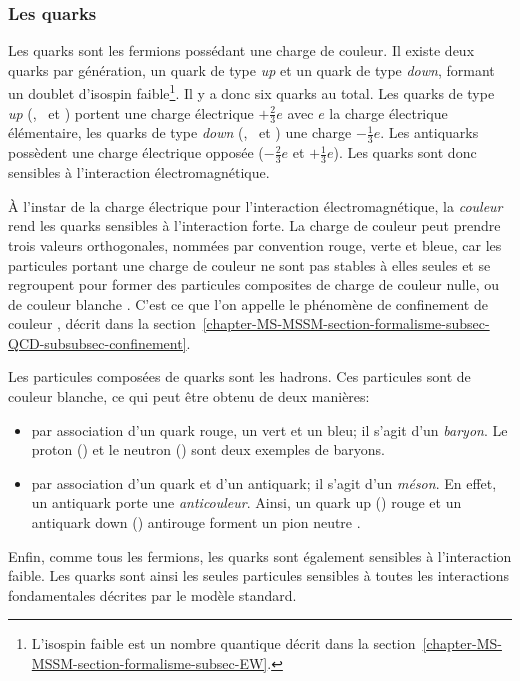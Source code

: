 \subsubsection{Les quarks}\label{chapter-MS-MSSM-section-SM_ptcs-subsec-fermions-subsubsec-quarks}
Les quarks sont les fermions possédant une charge de couleur.
Il existe deux quarks par génération, un quark de type \emph{up} et un quark de type \emph{down}, formant un doublet d'isospin faible\footnote{L'isospin faible est un nombre quantique décrit dans la section~\ref{chapter-MS-MSSM-section-formalisme-subsec-EW}.}. Il y a donc six quarks au total. Les quarks de type \emph{up} (\quarku, \quarkc\ et \quarkt) portent une charge électrique $+\frac{2}{3}e$ avec $e$ la charge électrique élémentaire, les quarks de type \emph{down} (\quarkd, \quarks\ et \quarkb) une charge $-\frac{1}{3}e$. Les antiquarks possèdent une charge électrique opposée ($-\frac{2}{3}e$ et $+\frac{1}{3}e$). Les quarks sont donc sensibles à l'interaction électromagnétique.
\par À l'instar de la charge électrique pour l'interaction électromagnétique, la \emph{couleur} rend les quarks sensibles à l'interaction forte. La charge de couleur peut prendre trois valeurs orthogonales, nommées par convention rouge, verte et bleue, car les particules portant une charge de couleur ne sont pas stables à elles seules et se regroupent pour former des particules composites de charge de couleur nulle, ou de couleur \og blanche \fg{}. C'est ce que l'on appelle le phénomène de \og confinement de couleur \fg, décrit dans la section~\ref{chapter-MS-MSSM-section-formalisme-subsec-QCD-subsubsec-confinement}.
\par Les particules composées de quarks sont les hadrons. Ces particules sont de couleur blanche, ce qui peut être obtenu de deux manières:
\begin{itemize}
\item par association d'un quark rouge, un vert et un bleu; il s'agit d'un \emph{baryon}. Le proton (\quarku\quarku\quarkd) et le neutron (\quarku\quarkd\quarkd) sont deux exemples de baryons.
\item par association d'un quark et d'un antiquark; il s'agit d'un \emph{méson}. En effet, un antiquark porte une \emph{anticouleur}. Ainsi, un quark up (\quarku) rouge et un antiquark down (\antiquarkd) \og antirouge \fg{} forment un pion neutre \pionnull.
\end{itemize}
\par Enfin, comme tous les fermions, les quarks sont également sensibles à l'interaction faible. Les quarks sont ainsi les seules particules sensibles à toutes les interactions fondamentales décrites par le modèle standard.

